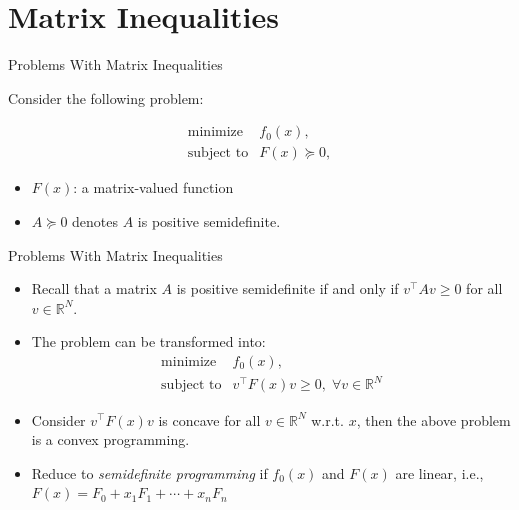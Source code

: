 \documentclass[10pt,ignorenonframetext,serif,onlymath]{beamer}
\providecommand{\tightlist}{%
  \setlength{\itemsep}{0pt}\setlength{\parskip}{0pt}}
\begin{document}
\hypertarget{sec:matrix-inequalities}{%
\section{Matrix Inequalities}\label{sec:matrix-inequalities}}

\begin{frame}{Problems With Matrix Inequalities}
\protect\hypertarget{sec:problems-with-matrix-inequalities}{}

Consider the following problem:

\[\begin{array}{ll}
    \text{minimize}    & f_0(x), \\
    \text{subject to}  & F(x) \succeq 0,
\end{array}\]

\begin{itemize}
\tightlist
\item
  \(F(x)\): a matrix-valued function
\item
  \(A \succeq 0\) denotes \(A\) is positive semidefinite.
\end{itemize}

\end{frame}

\begin{frame}{Problems With Matrix Inequalities}
\protect\hypertarget{sec:problems-with-matrix-inequalities-1}{}

\begin{itemize}
\tightlist
\item
  Recall that a matrix \(A\) is positive semidefinite if and only if
  \(v^\top A v \ge 0\) for all \(v \in \mathbb{R}^N\).
\item
  The problem can be transformed into: \[\begin{array}{ll}
            \text{minimize}      & f_0(x), \\
            \text{subject to}    & v^\top F(x) v \ge 0, \; \forall v \in \mathbb{R}^N
    \end{array}\]
\item
  Consider \(v^\top F(x) v\) is concave for all \(v \in \mathbb{R}^N\)
  w.r.t. \(x\), then the above problem is a convex programming.
\item
  Reduce to \emph{semidefinite programming} if \(f_0(x)\) and \(F(x)\)
  are linear, i.e., \(F(x) = F_0 + x_1 F_1 + \cdots + x_n F_n\)
\end{itemize}

\end{frame}
\end{document}
